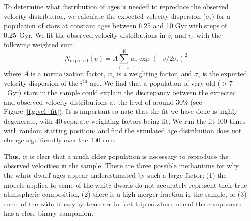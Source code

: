 To determine what distribution of ages is needed to reproduce the observed velocity distribution, we calculate the expected velocity dispersion ($\sigma_i$) for a population of stars at constant ages between 0.25 and 10 Gyr with steps of 0.25~Gyr. We fit the observed velocity distributions in $v_l$ and $v_b$ with the following weighted sum;
\begin{equation}
    N_{\mathrm{expected}}(v) = A\sum^{40}_{i=1} w_i \exp{(-v/2\sigma_i)^2}
\end{equation}
where $A$ is a normalization factor, $w_i$ is a weighting factor, and $\sigma_i$ is the expected velocity dispersion of the $i^{\mathrm{th}}$ age. We find that a population of very old ($>7$~Gyr) stars in the sample could explain the discrepancy between the expected and observed velocity distributions at the level of around 30\% (see Figure~\ref{fig:vel_fit}). It is important to note that the fit we have done is highly degenerate, with 40 separate weighting factors being fit. We run the fit 100 times with random starting positions and find the simulated age distribution does not change significantly over the 100 runs.


Thus, it is clear that a much older population is necessary to reproduce the observed velocities in the sample. There are three possible mechanisms for why the white dwarf ages appear underestimated by such a large factor: (1) the models applied to some of the white dwarfs do not accurately represent their true atmospheric composition, (2) there is a high merger fraction in the sample, or (3) some of the wide binary systems are in fact triples where one of the components has a close binary companion.

